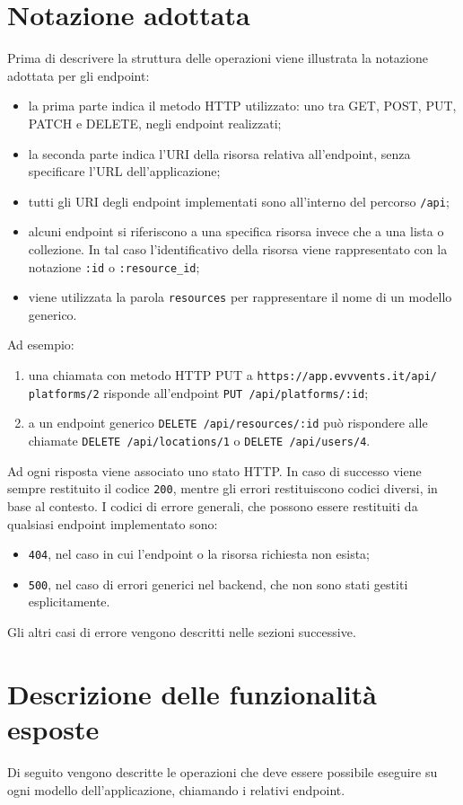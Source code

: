 \section{Notazione adottata}
Prima di descrivere la struttura delle operazioni viene illustrata la notazione adottata per gli endpoint:
\begin{itemize}
	\item la prima parte indica il metodo HTTP utilizzato: uno tra GET, POST, PUT, PATCH e DELETE, negli endpoint realizzati;
	\item la seconda parte indica l'URI della risorsa relativa all'endpoint, senza specificare l'URL dell'applicazione;
	\item tutti gli URI degli endpoint implementati sono all'interno del percorso \verb|/api|;
	\item alcuni endpoint si riferiscono a una specifica risorsa invece che a una lista o collezione. In tal caso l'identificativo della risorsa viene rappresentato con la notazione \verb|:id| o \verb|:resource_id|;
	\item viene utilizzata la parola \texttt{resources} per rappresentare il nome di un modello generico.
\end{itemize}
Ad esempio:
\begin{enumerate}
	\item una chiamata con metodo HTTP PUT a \verb|https://app.evvvents.it/api/| \\ \verb|platforms/2| risponde all'endpoint \verb|PUT /api/platforms/:id|;
	\item a un endpoint generico \verb|DELETE /api/resources/:id| può rispondere alle chiamate \verb|DELETE /api/locations/1| o \verb|DELETE /api/users/4|.
\end{enumerate}
Ad ogni risposta viene associato uno stato HTTP. In caso di successo viene sempre restituito il codice \verb|200|, mentre gli errori restituiscono codici diversi, in base al contesto. I codici di errore generali, che possono essere restituiti da qualsiasi endpoint implementato sono:
\begin{itemize}
	\item \verb|404|, nel caso in cui l'endpoint o la risorsa richiesta non esista;
	\item \verb|500|, nel caso di errori generici nel backend, che non sono stati gestiti esplicitamente.
\end{itemize}
Gli altri casi di errore vengono descritti nelle sezioni successive.

\section{Descrizione delle funzionalità esposte}
Di seguito vengono descritte le operazioni che deve essere possibile eseguire su ogni modello dell'applicazione, chiamando i relativi endpoint.

